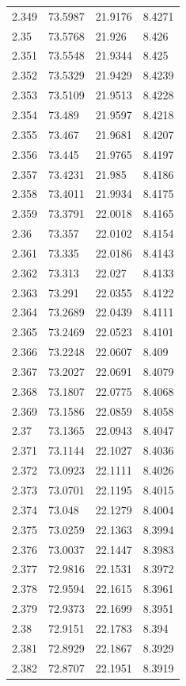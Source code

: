 \begin{tabular}{llll}
2.349 & 73.5987 & 21.9176 & 8.4271 \\
2.35 & 73.5768 & 21.926 & 8.426 \\
2.351 & 73.5548 & 21.9344 & 8.425 \\
2.352 & 73.5329 & 21.9429 & 8.4239 \\
2.353 & 73.5109 & 21.9513 & 8.4228 \\
2.354 & 73.489 & 21.9597 & 8.4218 \\
2.355 & 73.467 & 21.9681 & 8.4207 \\
2.356 & 73.445 & 21.9765 & 8.4197 \\
2.357 & 73.4231 & 21.985 & 8.4186 \\
2.358 & 73.4011 & 21.9934 & 8.4175 \\
2.359 & 73.3791 & 22.0018 & 8.4165 \\
2.36 & 73.357 & 22.0102 & 8.4154 \\
2.361 & 73.335 & 22.0186 & 8.4143 \\
2.362 & 73.313 & 22.027 & 8.4133 \\
2.363 & 73.291 & 22.0355 & 8.4122 \\
2.364 & 73.2689 & 22.0439 & 8.4111 \\
2.365 & 73.2469 & 22.0523 & 8.4101 \\
2.366 & 73.2248 & 22.0607 & 8.409 \\
2.367 & 73.2027 & 22.0691 & 8.4079 \\
2.368 & 73.1807 & 22.0775 & 8.4068 \\
2.369 & 73.1586 & 22.0859 & 8.4058 \\
2.37 & 73.1365 & 22.0943 & 8.4047 \\
2.371 & 73.1144 & 22.1027 & 8.4036 \\
2.372 & 73.0923 & 22.1111 & 8.4026 \\
2.373 & 73.0701 & 22.1195 & 8.4015 \\
2.374 & 73.048 & 22.1279 & 8.4004 \\
2.375 & 73.0259 & 22.1363 & 8.3994 \\
2.376 & 73.0037 & 22.1447 & 8.3983 \\
2.377 & 72.9816 & 22.1531 & 8.3972 \\
2.378 & 72.9594 & 22.1615 & 8.3961 \\
2.379 & 72.9373 & 22.1699 & 8.3951 \\
2.38 & 72.9151 & 22.1783 & 8.394 \\
2.381 & 72.8929 & 22.1867 & 8.3929 \\
2.382 & 72.8707 & 22.1951 & 8.3919 \\

\end{tabular}
